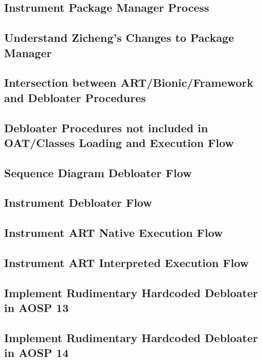 \subsection{Instrument Package Manager Process}
\subsection{Understand Zicheng's Changes to Package Manager}

\subsection{Intersection between ART/Bionic/Framework and Debloater Procedures}

\subsection{Debloater Procedures not included in OAT/Classes Loading and Execution Flow}

\subsection{Sequence Diagram Debloater Flow}

\subsection{Instrument Debloater Flow}

\subsection{Instrument ART Native Execution Flow}

\subsection{Instrument ART Interpreted Execution Flow}

\subsection{Implement Rudimentary Hardcoded Debloater in AOSP 13}

\subsection{Implement Rudimentary Hardcoded Debloater in AOSP 14}


% 

